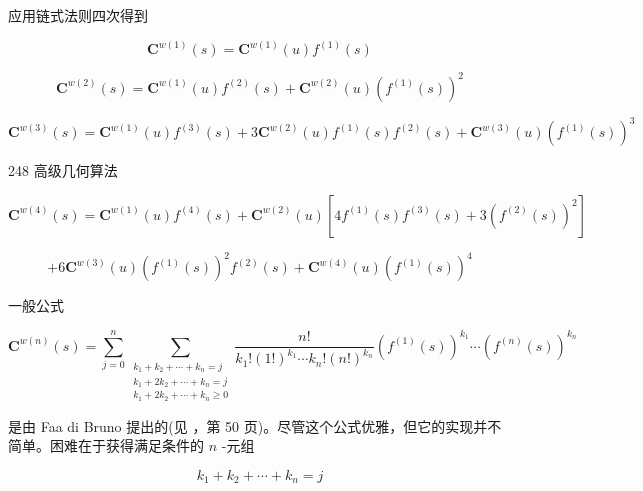 \documentclass[../main.tex]{subfiles}
\begin{document}
应用链式法则四次得到

\[
{\mathbf{C}}^{w\left( 1\right) }\left( s\right)  = {\mathbf{C}}^{w\left( 1\right) }\left( u\right) {f}^{\left( 1\right) }\left( s\right)
\]

\[
{\mathbf{C}}^{w\left( 2\right) }\left( s\right)  = {\mathbf{C}}^{w\left( 1\right) }\left( u\right) {f}^{\left( 2\right) }\left( s\right)  + {\mathbf{C}}^{w\left( 2\right) }\left( u\right) {\left( {f}^{\left( 1\right) }\left( s\right) \right) }^{2}
\]

\[
{\mathbf{C}}^{w\left( 3\right) }\left( s\right)  = {\mathbf{C}}^{w\left( 1\right) }\left( u\right) {f}^{\left( 3\right) }\left( s\right)  + 3{\mathbf{C}}^{w\left( 2\right) }\left( u\right) {f}^{\left( 1\right) }\left( s\right) {f}^{\left( 2\right) }\left( s\right)  + {\mathbf{C}}^{w\left( 3\right) }\left( u\right) {\left( {f}^{\left( 1\right) }\left( s\right) \right) }^{3}
\]

248 高级几何算法

\[
{\mathbf{C}}^{w\left( 4\right) }\left( s\right)  = {\mathbf{C}}^{w\left( 1\right) }\left( u\right) {f}^{\left( 4\right) }\left( s\right)  + {\mathbf{C}}^{w\left( 2\right) }\left( u\right) \left\lbrack  {4{f}^{\left( 1\right) }\left( s\right) {f}^{\left( 3\right) }\left( s\right)  + 3{\left( {f}^{\left( 2\right) }\left( s\right) \right) }^{2}}\right\rbrack
\]

\[
+ 6{\mathbf{C}}^{w\left( 3\right) }\left( u\right) {\left( {f}^{\left( 1\right) }\left( s\right) \right) }^{2}{f}^{\left( 2\right) }\left( s\right)  + {\mathbf{C}}^{w\left( 4\right) }\left( u\right) {\left( {f}^{\left( 1\right) }\left( s\right) \right) }^{4} \tag{6.39}
\]

一般公式

\[
{\mathbf{C}}^{w\left( n\right) }\left( s\right)  = \mathop{\sum }\limits_{{j = 0}}^{n}\mathop{\sum }\limits_{\substack{{{k}_{1} + {k}_{2} + \cdots  + {k}_{n} = j} \\  {{k}_{1} + 2{k}_{2} + \cdots  + {k}_{n} = j} \\  {{k}_{1} + 2{k}_{2} + \cdots  + {k}_{n} \geq  0} }}\frac{n!}{{k}_{1}!{\left( 1!\right) }^{{k}_{1}}\cdots {k}_{n}!{\left( n!\right) }^{{k}_{n}}}{\left( {f}^{\left( 1\right) }\left( s\right) \right) }^{{k}_{1}}\cdots {\left( {f}^{\left( n\right) }\left( s\right) \right) }^{{k}_{n}} \tag{6.40}
\]

是由 Faa di Bruno 提出的(见 \cite{Knut73}，第 50 页)。尽管这个公式优雅，但它的实现并不简单。困难在于获得满足条件的 \(n\) -元组

\[
{k}_{1} + {k}_{2} + \cdots  + {k}_{n} = j
\]
\end{document}
